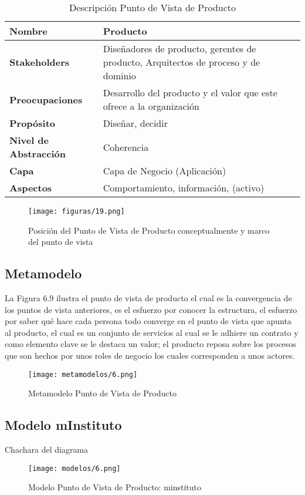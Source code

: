   \begin{table}[!h]
  	\centering
  	\begin{tabular}{lp{8cm}}
  		\toprule
  		\textbf{Nombre} & \textbf{Producto} \\
  		\midrule
  		\textbf{Stakeholders} & Diseñadores de producto, gerentes de producto, Arquitectos de proceso y de dominio \\
  		\textbf{Preocupaciones} & Desarrollo del producto y el valor que este ofrece a la organización \\
  		\textbf{Propósito} & Diseñar, decidir \\
  		\textbf{Nivel de Abstracción} & Coherencia \\
  		\textbf{Capa} & Capa de Negocio (Aplicación) \\
  		\textbf{Aspectos} & Comportamiento, información, (activo) \\
  		\bottomrule
  	\end{tabular}
	\captionsetup{width=.95\textwidth}
	\caption{Descripción Punto de Vista de Producto}
	\label{tabla9}
  \end{table}

  \begin{figure}[!h]
	\centering
	\texttt{[image: figuras/19.png]}
	\captionsetup{width=.95\textwidth}
	\caption{Posición del Punto de Vista de Producto conceptualmente y marco del punto de vista}
	\label{figura19}
  \end{figure}
  
  \subsection{Metamodelo}
  La Figura 6.9 ilustra el punto de vista de producto el cual es la convergencia de los puntos de vista anteriores, es el esfuerzo por conocer la estructura, el esfuerzo por saber qué hace cada persona todo converge en el punto de vista que apunta al producto, el cual es un conjunto de servicios al cual se le adhiere un contrato y como elemento clave se le destaca un valor; el producto reposa sobre los procesos que son hechos por unos roles de negocio los cuales corresponden a unos actores.

\begin{figure}[!h]
	\centering
	\texttt{[image: metamodelos/6.png]}
	\captionsetup{width=.95\textwidth}
	\caption{Metamodelo Punto de Vista de Producto}
	\label{metamodelo6}
\end{figure}

\subsection{Modelo mInstituto}Chachara del diagrama
\begin{figure}[!h]
	\centering
	\texttt{[image: modelos/6.png]}
	\captionsetup{width=.95\textwidth}
	\caption{Modelo Punto de Vista de Producto: minstituto}
	\label{modelo6}
\end{figure}